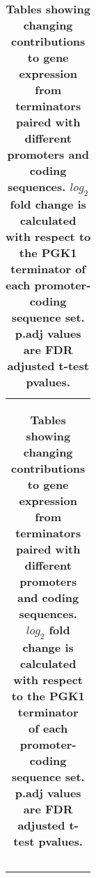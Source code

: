 \documentclass[../main.tex]{subfiles}
\begin{document}
\begin{table}[bh!]
{\begin{tabular}{ c }
\begin{tabularx}{0.8\textwidth} { 
  | >{\centering\arraybackslash}X 
  | >{\centering\arraybackslash}X 
  | >{\centering\arraybackslash}X | }
\hline
\end{tabularx} \\
\end{tabular}}\endgroup{}\caption[Tables showing changing contributions to gene expression from terminators paired with different promoters and coding sequences.]{\textbf{Tables showing changing contributions to gene expression from terminators paired with different promoters and coding sequences. $log_2$ fold change is calculated with respect to the PGK1 terminator of each promoter-coding sequence set. p.adj values are FDR adjusted t-test pvalues.}}\label{tab:norm-terminator-mcherry-sig-effect}\end{table}

\begin{table}[ph!]
\def\arraystretch{1.25}
\centering 
\begingroup\setlength{\tabcolsep}{5pt}\fontsize{9}{9}
\end{table}
\end{document}
